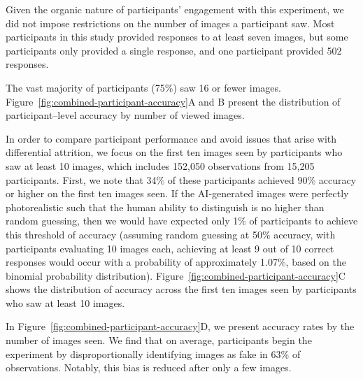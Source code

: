 \begin{figure*}[h]
    \label{fig:combined-participant-accuracy}

\end{figure*}

Given the organic nature of participants' engagement with this experiment, we did not impose restrictions on the number of images a participant saw. Most participants in this study provided responses to at least seven images, but some participants only provided a single response, and one participant provided 502 responses. 

The vast majority of participants (75\%) saw 16 or fewer images. Figure~\ref{fig:combined-participant-accuracy}A and B present the distribution of participant--level accuracy by number of viewed images. 

In order to compare participant performance and avoid issues that arise with differential attrition, we focus on the first ten images seen by participants who saw at least 10 images, which includes 152,050 observations from 15,205 participants. First, we note that 34\% of these participants achieved 90\% accuracy or higher on the first ten images seen. If the AI-generated images were perfectly photorealistic such that the human ability to distinguish is no higher than random guessing, then we would have expected only 1\% of participants to achieve this threshold of accuracy (assuming random guessing at 50\% accuracy, with participants evaluating 10 images each, achieving at least 9 out of 10 correct responses would occur with a probability of approximately 1.07\%, based on the binomial probability distribution). Figure~\ref{fig:combined-participant-accuracy}C shows the distribution of accuracy across the first ten images seen by participants who saw at least 10 images.

In Figure~\ref{fig:combined-participant-accuracy}D, we present accuracy rates by the number of images seen. We find that on average, participants begin the experiment by disproportionally identifying images as fake in 63\% of observations. Notably, this bias is reduced after only a few images.


